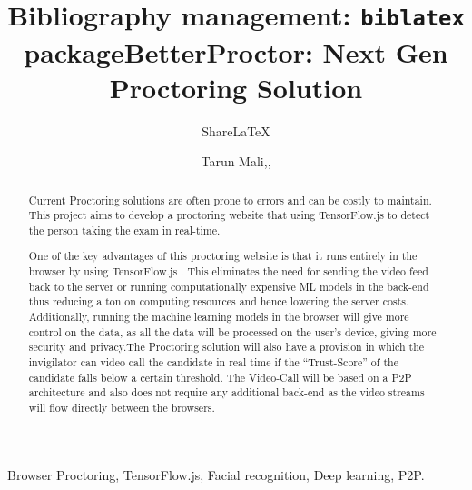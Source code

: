 \documentclass[journal]{IEEEtran}
\title{Bibliography management: \texttt{biblatex} package}
\author{Share\LaTeX}
\date{ }
\begin{document}
\title{BetterProctor: Next Gen Proctoring Solution}
\author{Tarun Mali,,}%
\vspace{-0.5cm}

\maketitle

\begin{abstract} 
Current Proctoring solutions are often prone to errors and can be
costly to maintain. This project aims to develop a proctoring website
that using TensorFlow.js to detect the person taking the exam in real-time. 

One of the key advantages of this proctoring website is that it
runs entirely in the browser by using TensorFlow.js . This eliminates
the need for sending the video feed back to the server or running
computationally expensive ML models in the back-end thus reducing
a ton on computing resources and hence lowering the server costs.
Additionally, running the machine learning models in the browser will
give more control on the data, as all the data will be processed on
the user’s device, giving more security and privacy.The Proctoring
solution will also have a provision in which the invigilator can video
call the candidate in real time if the “Trust-Score” of the candidate
falls below a certain threshold. The Video-Call will be based on a P2P
architecture and also does not require any additional back-end as the
video streams will flow directly between the browsers.\\

\end{abstract}

\begin{IEEEkeywords}
 Browser Proctoring, TensorFlow.js, Facial recognition, Deep learning, P2P.
\end{IEEEkeywords}
\end{document}

